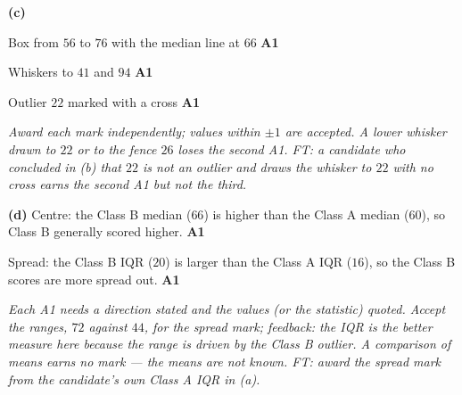\documentclass[12pt, twoside]{article}
\begin{document}
\begin{enumerate}[itemsep=0.3cm]
\textbf{(c)}

\begin{center}
\end{center}

Box from $56$ to $76$ with the median line at $66$ \hfill \textbf{A1}

Whiskers to $41$ and $94$ \hfill \textbf{A1}

Outlier $22$ marked with a cross \hfill \textbf{A1}

\emph{Award each mark independently; values within $\pm 1$ are accepted. A
lower whisker drawn to $22$ or to the fence $26$ loses the second A1.
FT: a candidate who concluded in (b) that $22$ is not an outlier and draws the
whisker to $22$ with no cross earns the second A1 but not the third.}

\textbf{(d)} Centre: the Class B median ($66$) is higher than the Class A
median ($60$), so Class B generally scored higher. \hfill \textbf{A1}

Spread: the Class B IQR ($20$) is larger than the Class A IQR ($16$), so the
Class B scores are more spread out. \hfill \textbf{A1}

\emph{Each A1 needs a direction stated and the values (or the statistic)
quoted. Accept the ranges, $72$ against $44$, for the spread mark; feedback:
the IQR is the better measure here because the range is driven by the Class B
outlier. A comparison of means earns no mark --- the means are not known.
FT: award the spread mark from the candidate's own Class A IQR in (a).}

\end{enumerate}
\end{document}
